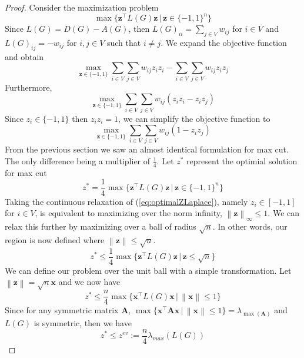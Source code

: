 \documentclass[12pt]{article}
\theoremstyle{plain}
\theoremstyle{definition}
\newcommand{\norm}[1]{\left\lVert#1\right\rVert}
\begin{document}
\begin{proof}
    Consider the maximization problem 
    \[
    \max\lbrace \mathbf{z}^\top L(G) \mathbf{z}\,|\,\mathbf{z} \in \lbrace -1,1 \rbrace^n  \rbrace
    \]
    Since $L(G) = D(G) - A(G)$, then $L(G)_{ii} = \sum_{j\in V} w_{ij}$ for $i \in V$ and $L(G)_{ij} = -w_{ij}$ for $i,j \in V$ such that $i \neq j$. We expand the objective function and obtain
    \[
        \max_{\mathbf{z} \in \lbrace -1,1 \rbrace} \sum_{i \in V}\sum_{j \in V} w_{ij} z_i z_i - \sum_{i \in V}\sum_{j \in V} w_{ij}z_i z_j
    \]
    Furthermore,
    \[
        \max_{\mathbf{z} \in \lbrace -1,1 \rbrace} \sum_{i \in V} \sum_{j \in V} w_{ij} (z_i z_i - z_i z_j) 
    \]
    Since $z_i \in \lbrace -1, 1 \rbrace$ then $z_i z_i=1$, we can simplify the objective function to
    \[
        \max_{\mathbf{z} \in \lbrace -1,1 \rbrace} \sum_{i \in V} \sum_{j \in V} w_{ij} (1- z_i z_j)
    \]
    From the previous section we saw an almost identical formulation for max cut. The only difference being a multiplier of $\frac{1}{4}$. Let $z^*$ represent the optimial solution for max cut
    \begin{equation}\label{eq:optimalZLaplace}
        z^* = \frac{1}{4} \max \lbrace \mathbf{z}^\top L(G) \mathbf{z} \,|\, \mathbf{z} \in \lbrace -1,1 \rbrace^n \rbrace
    \end{equation}
    Taking the continuous relaxation of (\ref{eq:optimalZLaplace}), namely $z_i \in \left[-1,1 \right]$ for $i \in V$, is equivalent to maximizing
    over the norm infinity, $\norm{\mathbf{z}}_\infty \leq 1$. We can relax this further by maximizing over a ball of radius $\sqrt{n}$. In other words,
    our region is now defined where $\norm{\mathbf{z}} \leq \sqrt{n}$. 
    \begin{equation}
    z^* \leq \frac{1}{4} \max \lbrace \mathbf{z}^\top L(G) \mathbf{z} \,|\, \mathbf{z} \leq \sqrt{n} \rbrace
    \end{equation}    
    We can define our problem over the unit ball with a simple transformation. Let $\norm{\mathbf{z}} = \sqrt{n} \mathbf{x}$ and
    we now have
    \begin{equation}
        z^* \leq \frac{n}{4} \max \lbrace \mathbf{x}^\top L(G) \mathbf{x} \,|\, \norm{\mathbf{x}} \leq 1 \rbrace
    \end{equation}  
    Since for any symmetric matrix $\mathbf{A}$, $\max\lbrace \mathbf{x}^\top \mathbf{A} \mathbf{x}\,|\, \norm{\mathbf{x}} \leq 1 \rbrace = \lambda_{\max(\mathbf{A})}$ 
    and $L(G)$ is symmetric, then we have 
    \begin{equation}
    z^* \leq z^{ev} := \dfrac{n}{4} \lambda_{max}(L(G))
    \end{equation}
\end{proof}
\end{document}
